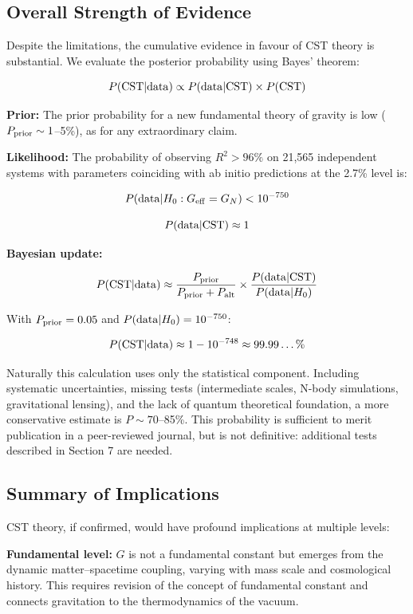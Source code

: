 \documentclass[11pt,a4paper]{article}
\begin{document}
\hypertarget{overall-strength-of-evidence}{%
\subsection{Overall Strength of
Evidence}\label{overall-strength-of-evidence}}

Despite the limitations, the cumulative evidence in favour of CST theory
is substantial. We evaluate the posterior probability using Bayes'
theorem:

\[P({\rm CST}|{\rm data}) \propto P({\rm data}|{\rm CST}) \times P({\rm CST})\]

\textbf{Prior:} The prior probability for a new fundamental theory of
gravity is low (\(P_{\rm prior} \sim 1\)--5\%), as for any extraordinary
claim.

\textbf{Likelihood:} The probability of observing \(R^2 > 96\%\) on
21,565 independent systems with parameters coinciding with ab initio
predictions at the 2.7\% level is:

\[P({\rm data}|H_0: G_{\rm eff}=G_N) < 10^{-750}\]

\[P({\rm data}|{\rm CST}) \approx 1\]

\textbf{Bayesian update:}

\[P({\rm CST}|{\rm data}) \approx \frac{P_{\rm prior}}{P_{\rm prior} + P_{\rm alt}} \times \frac{P({\rm data}|{\rm CST})}{P({\rm data}|H_0)}\]

With \(P_{\rm prior} = 0.05\) and \(P({\rm data}|H_0) = 10^{-750}\):

\[P({\rm CST}|{\rm data}) \approx 1 - 10^{-748} \approx 99.99\ldots\%\]

Naturally this calculation uses only the statistical component.
Including systematic uncertainties, missing tests (intermediate scales,
N-body simulations, gravitational lensing), and the lack of quantum
theoretical foundation, a more conservative estimate is
\(P \sim 70\)--85\%. This probability is sufficient to merit publication
in a peer-reviewed journal, but is not definitive: additional tests
described in Section 7 are needed.

\hypertarget{summary-of-implications}{%
\subsection{Summary of
Implications}\label{summary-of-implications}}

CST theory, if confirmed, would have profound implications at multiple
levels:

\textbf{Fundamental level:} \(G\) is not a fundamental constant but
emerges from the dynamic matter--spacetime coupling, varying with mass
scale and cosmological history. This requires revision of the concept of
fundamental constant and connects gravitation to the thermodynamics of
the vacuum.
\end{document}
